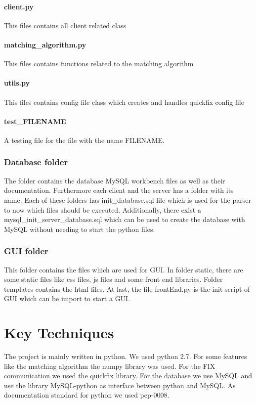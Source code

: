 \documentclass[a4paper, 11pt]{article}
\begin{document}
\paragraph*{client.py} This files contains all client related class
\paragraph*{matching\_algorithm.py} This files contains functions related to the matching algorithm
\paragraph*{utils.py} This files contains config file class which creates and handles quickfix config file 
\paragraph*{test\_FILENAME} A testing file for the file with the name FILENAME.

\subsubsection*{Database folder} 
The folder contains the database MySQL workbench files as well as their documentation. Furthermore each client and the server has
a folder with its name. Each of these folders has init\_database.sql file which is used for the parser to now which files should be
executed. Additionally, there exist a mysql\_init\_server\_database.sql which can be used to create the database with MySQL without
needing to start the python files.

\subsubsection*{GUI folder}
This folder contains the files which are used for GUI. In folder static, there are some static files like css files, js files and some front end libraries. Folder templates contains the html files. At last, the file frontEnd.py is the init script of GUI which can be import to start a GUI. 

\section*{Key Techniques}

The project is mainly written in python. We used python 2.7. For some features like the matching algorithm the numpy library \cite{numpy} was used.
For the FIX communication we used the quickfix library. For the database we use MySQL and use the library MySQL-python as interface between python and MySQL.
As documentation standard for python we used pep-0008.
\end{document}
